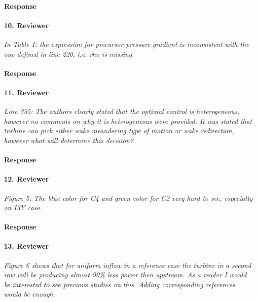 \documentclass[]{article}
\begin{document}
\paragraph{Response} 

\hrulefill

\paragraph{10. Reviewer} \textit{In Table 1: the expression for precursor pressure gradient is inconsistent with the one defined in line 220, i.e. rho is missing.}

\paragraph{Response} 

\hrulefill

\paragraph{11. Reviewer} \textit{Line 335: The authors clearly stated that the optimal control is heterogeneous, however no comments on why it is heterogeneous were provided. It was stated that turbine can pick either wake meandering type of motion or wake redirection, however what will determine this decision?}

\paragraph{Response} 

\hrulefill

\paragraph{12. Reviewer} \textit{Figure 5: The blue color for C4 and green color for C2 very hard to see, especially on I3Y case.}

\paragraph{Response} 

\hrulefill

\paragraph{13. Reviewer} \textit{Figure 6 shows that for uniform inflow in a reference case the turbine in a second row will be producing almost 90\% less power then upstream. As a reader I would be interested to see previous studies on this. Adding corresponding references would be enough.}
\end{document}
